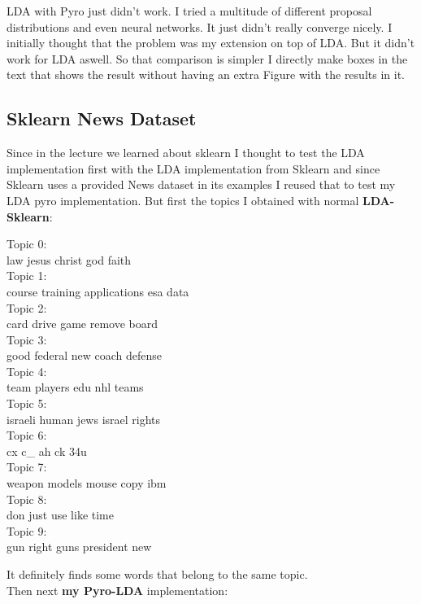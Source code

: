 \documentclass[10pt,conference,compsocconf]{IEEEtran}
\begin{document}
LDA with Pyro just didn't work. I tried a multitude of different proposal distributions and even neural networks. It just didn't really converge nicely. I initially thought that the problem was my extension on top of LDA. But it didn't work for LDA aswell. So that comparison is simpler I directly make boxes in the text that shows the result without having an extra Figure with the results in it. 

\subsection{Sklearn News Dataset}

Since in the lecture we learned about sklearn I thought to test the LDA implementation first with the LDA implementation from Sklearn and since Sklearn uses a provided News dataset in its examples I reused that to test my LDA pyro implementation. But first the topics I obtained with normal \textbf{LDA-Sklearn}: 
\begin{framed}
	Topic 0:\\
	law jesus christ god faith\\
	Topic 1:\\
	course training applications esa data\\
	Topic 2:\\
	card drive game remove board\\
	Topic 3:\\
	good federal new coach defense\\
	Topic 4:\\
	team players edu nhl teams\\
	Topic 5:\\
	israeli human jews israel rights\\
	Topic 6:\\
	cx c\_ ah ck 34u\\
	Topic 7:\\
	weapon models mouse copy ibm\\
	Topic 8:\\
	don just use like time\\
	Topic 9:\\
	gun right guns president new\\
\end{framed}
It definitely finds some words that belong to the same topic.\\
Then next \textbf{my Pyro-LDA} implementation:
\end{document}
